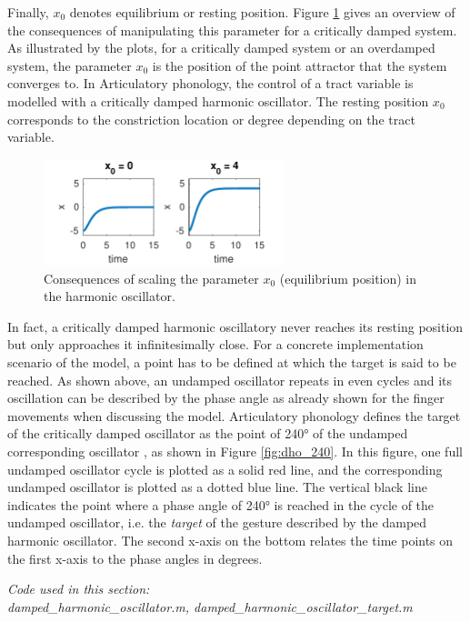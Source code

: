 \hspace*{-1mm}Finally, $x_0$ denotes equilibrium or resting position. Figure \ref{fig:dho_rest} gives an over\-view of the consequences of manipulating this parameter for a critically damped system. As illustrated by the plots, for a critically damped system or an overdamped system, the parameter $x_0$ is the position of the point attractor that the system converges to. In Articulatory phonology, the control of a tract variable is modelled with a critically damped harmonic oscillator. The resting position $x_0$ corresponds to the constriction location or degree depending on the tract variable. 

\begin{figure}
\includegraphics[width=7cm]{figures/ch3/dho_x0.pdf}
\caption{Consequences of scaling the parameter $x_0$ (equilibrium position) in the harmonic oscillator.}
\label{fig:dho_rest}
\end{figure}

In fact, a critically damped harmonic oscillatory never reaches its resting position but only approaches it infinitesimally close. For a concrete implementation scenario of the model, a point has to be defined at which the target is said to be reached. As shown above, an undamped oscillator repeats in even cycles and its oscillation can be described by the phase angle as already shown for the finger movements when discussing the \citet{HakenKelsoBunz1985} model. Articulatory phonology defines the target of the critically damped oscillator as the point of 240° of the undamped corresponding oscillator \citep{BrowmanGoldstein1990}, as shown in Figure \ref{fig:dho_240}. In this figure, one full undamped oscillator cycle is plotted as a solid red line, and the corresponding undamped oscillator is plotted as a dotted blue line. The vertical black line indicates the point where a phase angle of 240° is reached in the cycle of the undamped oscillator, i.e. the \emph{target} of the gesture described by the damped harmonic oscillator. The second x-axis on the bottom relates the time points on the first x-axis to the phase angles in degrees.

\medskip\noindent\textit{Code used in this section: \\
damped\_harmonic\_oscillator.m, damped\_harmonic\_oscillator\_target.m}

